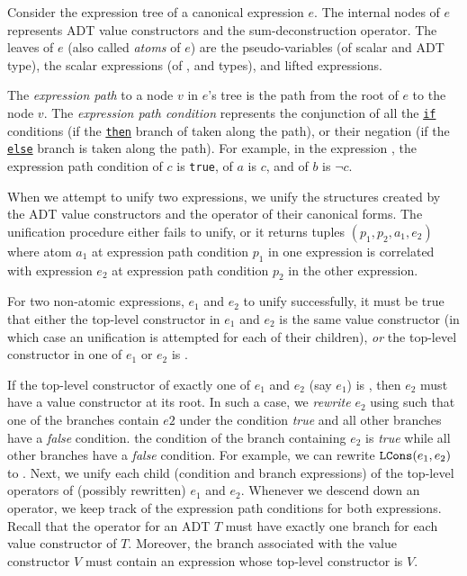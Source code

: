 Consider the expression tree of a canonical expression $e$.
The internal nodes of $e$ represents ADT value constructors and
the \sumDtor{} sum-deconstruction operator.
The leaves of $e$ (also called {\em atoms} of $e$) are the
pseudo-variables (of scalar and ADT type),
the scalar expressions (of ,  and  types),
and lifted expressions.

The {\em expression path} to a node $v$ in $e$'s tree is the path from the root
of $e$ to the node $v$.
The {\em expression path condition} represents the conjunction of all the \underline{\tt if}
conditions (if the \underline{\tt then} branch of taken along the path), or their
negation (if the \underline{\tt else} branch is taken along the path).
For example, in the expression   ,
the expression path condition of $c$ is {\tt true}, of $a$ is $c$,
and of $b$ is $\neg c$.

When we attempt to unify two expressions, we unify the
structures created by the ADT value constructors and
the \sumDtor{} operator of their canonical forms.
The unification procedure either fails to unify, or it
returns tuples $(p_1,p_2,a_1,e_2)$ where atom $a_1$
at expression path condition $p_1$ in one expression is correlated
with expression $e_2$ at expression path condition $p_2$ in the other expression.

For two non-atomic expressions, $e_1$ and $e_2$ to unify successfully,
it must be true that either the top-level constructor in $e_1$ and $e_2$ is
the same value constructor (in which case an unification is attempted for each
of their children),
{\em or} the top-level constructor in one of $e_1$ or $e_2$ is \sumDtor{}.

If the top-level constructor of exactly one of $e_1$ and $e_2$ (say $e_1$)
is \sumDtor{}, then $e_2$ must have a value constructor at its root.
In such a case, we {\em rewrite} $e_2$ using \sumDtor{} such that
one of the branches contain $e2$ under the condition {\em true}
and all other branches have a {\em false} condition.
the condition of the branch containing $e_2$ is {\em true}
while all other branches have a {\em false} condition.
For example, we can rewrite ${\tt LCons}(e_1, e_2)$ to  
.
Next, we unify each child (condition and branch expressions) of the top-level
\sumDtor{} operators of (possibly rewritten) $e_1$ and $e_2$.
Whenever we descend down an \sumDtor{} operator, we keep track of
the expression path conditions for both expressions.
Recall that the \sumDtor{} operator for an ADT $T$ must have exactly one branch
for each value constructor of $T$.
Moreover, the branch associated with the value constructor $V$ must contain
an expression whose top-level constructor is $V$.

